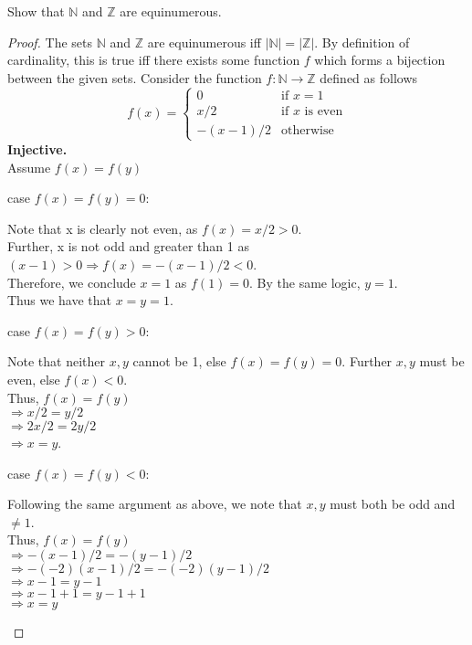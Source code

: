 \documentclass[12pt]{jhwhw}
\begin{document}
\problem{}

	Show that $\mathbb{N}$ and $\mathbb{Z}$ are equinumerous.

\solution
\begin{proof}
	
	The sets $\mathbb{N}$ and $\mathbb{Z}$ are equinumerous iff 
	$|\mathbb{N}| = |\mathbb{Z}|$. By definition of cardinality,
	this is true iff there exists some function $f$ which forms a bijection between
	the given sets.
	\bigbreak
	Consider the function $f: \mathbb{N} \rightarrow \mathbb{Z}$ defined as follows
	$$
		f(x) = 
		\begin{cases}
			0 & \text{if }x = 1 \\
			x/2 & \text{if $x$ is even} \\
			-(x-1)/2 & \text{otherwise}
		\end{cases}
	$$
	\bigbreak
	\textbf{Injective.} \\
	Assume $f(x) = f(y)$
	\bigbreak

	case $f(x) = f(y) = 0$:
	\begin{addmargin}{2em}
		Note that x is clearly not even, as $f(x) = x/2 > 0$. \\
		Further, x is not odd and greater than 1 as $(x-1) > 0 \Rightarrow f(x) = -(x-1)/2 < 0$. \\
		Therefore, we conclude $x = 1$ as $f(1) = 0$.
		By the same logic, $y = 1$. \\
		Thus we have that $x = y = 1$.
	\end{addmargin}

	case $f(x) = f(y) > 0$:
	\begin{addmargin}{2em}
		Note that neither $x, y$ cannot be 1, else $f(x) = f(y) = 0$. Further $x, y$ must be even, else $f(x) < 0$. \\
		Thus, $f(x) = f(y)$ \\
		$\Rightarrow x/2 = y/2$ \\
		$\Rightarrow 2x/2 = 2y/2$ \\
		$\Rightarrow x = y$.
	\end{addmargin}

	case $f(x) = f(y) < 0$:
	\begin{addmargin}{2em}
		Following the same argument as above, we note that $x,y$ must both be odd and $\neq 1$. \\
		Thus, $f(x) = f(y)$ \\
		$\Rightarrow -(x-1)/2 = -(y-1)/2$ \\
		$\Rightarrow -(-2)(x-1)/2 = -(-2)(y-1)/2$ \\
		$\Rightarrow x-1 = y-1$ \\
		$\Rightarrow x-1+1 = y-1+1$ \\
		$\Rightarrow x = y$ \\
	\end{addmargin}


\end{proof}
\end{document}
